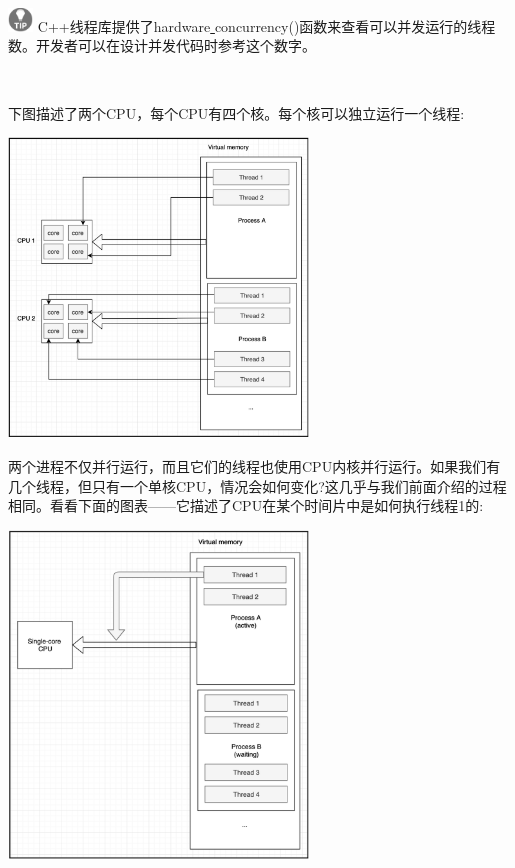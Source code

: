 \hspace*{\fill} \\ %
\includegraphics[width=0.05\textwidth]{images/tip}
C++线程库提供了hardware\underline{ }concurrency()函数来查看可以并发运行的线程数。开发者可以在设计并发代码时参考这个数字。 \par
\noindent\textbf{}\ \par

下图描述了两个CPU，每个CPU有四个核。每个核可以独立运行一个线程: \par

\begin{center}
	\includegraphics[width=0.6\textwidth]{content/Section-2/Chapter-8/10}
\end{center}

两个进程不仅并行运行，而且它们的线程也使用CPU内核并行运行。如果我们有几个线程，但只有一个单核CPU，情况会如何变化?这几乎与我们前面介绍的过程相同。看看下面的图表——它描述了CPU在某个时间片中是如何执行线程1的: \par

\begin{center}
	\includegraphics[width=0.6\textwidth]{content/Section-2/Chapter-8/11}
\end{center}

